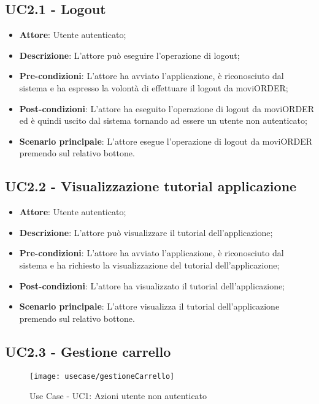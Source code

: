 \subsection{UC2.1 - Logout}

\begin{itemize}
	\item \textbf{Attore}: Utente autenticato;
	\item \textbf{Descrizione}: L'attore può eseguire l'operazione di logout;
	\item \textbf{Pre-condizioni}: L'attore ha avviato l'applicazione, è riconosciuto dal sistema e ha espresso la volontà di effettuare il logout da moviORDER;
	\item \textbf{Post-condizioni}: L'attore ha eseguito l'operazione di logout da moviORDER ed è quindi uscito dal sistema tornando ad essere un utente non autenticato;
	\item \textbf{Scenario principale}: L'attore esegue l'operazione di logout da moviORDER premendo sul relativo bottone.
\end{itemize}

\subsection{UC2.2 - Visualizzazione tutorial applicazione}

\begin{itemize}
	\item \textbf{Attore}: Utente autenticato;
	\item \textbf{Descrizione}: L'attore può visualizzare il tutorial dell'applicazione;
	\item \textbf{Pre-condizioni}: L'attore ha avviato l'applicazione, è riconosciuto dal sistema e ha richiesto la visualizzazione del tutorial dell'applicazione;
	\item \textbf{Post-condizioni}: L'attore ha visualizzato il tutorial dell'applicazione;
	\item \textbf{Scenario principale}: L'attore visualizza il tutorial dell'applicazione premendo sul relativo bottone.
\end{itemize}

\subsection{UC2.3 - Gestione carrello}

\begin{figure}[!h] 
    \centering 
    \texttt{[image: usecase/gestioneCarrello]} 
    \caption{Use Case - UC1: Azioni utente non autenticato}
\end{figure}

